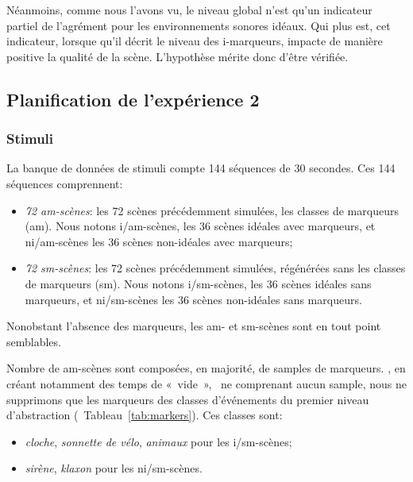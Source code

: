 \documentclass[twoside,twocolumn]{article}
\begin{document}
Néanmoins, comme nous l'avons vu, le niveau global n'est qu'un indicateur partiel de l'agrément pour les environnements sonores idéaux. Qui plus est, cet indicateur, lorsque qu'il décrit le niveau des i-marqueurs, impacte de manière positive la qualité de la scène. L'hypothèse mérite donc d'être vérifiée. 

\subsection{Planification de l'expérience 2}

\subsubsection*{Stimuli}

La banque de données de stimuli compte 144 séquences de 30 secondes. Ces 144 séquences comprennent:

\begin{itemize}
\item \emph{72 am-scènes}: les 72 scènes précédemment simulées,   les classes de marqueurs (am). Nous notons i/am-scènes, les 36 scènes idéales avec marqueurs, et ni/am-scènes les 36 scènes non-idéales avec marqueurs;
\item \emph{72 sm-scènes}: les 72 scènes précédemment simulées, régénérées sans les classes de marqueurs (sm). Nous notons i/sm-scènes, les 36 scènes idéales sans marqueurs, et ni/sm-scènes les 36 scènes non-idéales sans marqueurs.
\end{itemize}

Nonobstant l'absence des marqueurs, les am- et sm-scènes sont en tout point semblables. 

Nombre de am-scènes sont composées, en majorité, de samples de marqueurs.  , en créant notamment des temps de «~vide~», \ie~ne comprenant aucun sample, nous ne supprimons que les marqueurs des classes d'événements du premier niveau d'abstraction (\cf~Tableau~\ref{tab:markers}). Ces classes sont: 

\begin{itemize}
\item \emph{cloche}, \emph{sonnette de vélo}, \emph{animaux} pour les i/sm-scènes;
\item \emph{sirène}, \emph{klaxon} pour les ni/sm-scènes.
\end{itemize}
 
\end{document}
